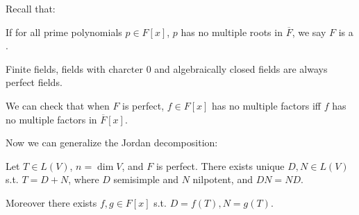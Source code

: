 Recall that:
\begin{definition}
	If for all prime polynomials $p\in F[x]$,
	$p$ has no multiple roots in $\overline{F}$,
	we say $F$ is a .

	Finite fields, fields with charcter 0 and algebraically closed fields
	are always perfect fields.
\end{definition}

We can check that when $F$ is perfect, $f\in F[x]$ has no multiple factors iff
$f$ has no multiple factors in $\overline{F}[x]$.

Now we can generalize the Jordan decomposition:
\begin{proposition}
    Let $T\in L(V)$, $n = \dim V$, and $F$ is perfect.
	There exists unique $D,N\in L(V)$ s.t. $T = D+N$, where $D$ semisimple and
	$N$ nilpotent, and $DN = ND$.

	Moreover there exists $f,g\in F[x]$ s.t. $D = f(T), N = g(T)$.
\end{proposition}
